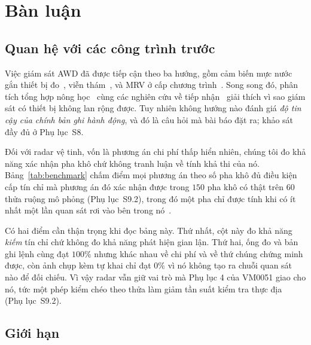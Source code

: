 \section{Bàn luận}
\label{sec:discussion}

\subsection{Quan hệ với các công trình trước}

Việc giám sát AWD đã được tiếp cận theo ba hướng, gồm cảm biến mực nước gắn thiết bị
đo~\cite{delacruz2022}, viễn thám~\cite{lovell2019,islam2026alose,mlrice2025,narayanan2024},
và MRV ở cấp chương trình~\cite{qd1490,mae2026progress,irri2026mrv}. Song song
đó, phân tích tổng hợp nông học~\cite{carrijo2017} cùng các nghiên cứu về tiếp
nhận~\cite{lampayan2015,enriquez2021} giải thích vì sao giám sát có thiết bị
không lan rộng được. Tuy nhiên không hướng nào đánh giá \emph{độ tin cậy của
chính bản ghi hành động}, và đó là câu hỏi mà bài báo đặt ra; khảo sát đầy đủ ở
Phụ lục~S8.

Đối với radar vệ tinh, vốn là phương án chi phí thấp hiển nhiên, chúng tôi đo khả
năng xác nhận pha khô chứ không tranh luận về tính khả thi của nó. Bảng~\ref{tab:benchmark} chấm điểm mọi phương án theo số pha khô đủ điều kiện cấp tín
chỉ mà phương án đó xác nhận được trong $150$ pha khô có thật trên $60$ thửa ruộng mô
phỏng (Phụ lục~S9.2), trong đó một pha chỉ được tính khi có ít nhất một lần quan sát
rơi vào bên trong nó~\cite{clauss2017s1,hashemi2022s1,delacruz2022}.

Có hai điểm cần thận trọng khi đọc bảng này. Thứ nhất, cột này đo khả năng
\emph{kiếm} tín chỉ chứ không đo khả năng phát hiện gian lận. Thứ hai, ống đo và
bản ghi lệnh cùng đạt $100\%$ nhưng khác nhau về chi phí và về thứ chúng chứng
minh được, còn ảnh chụp kèm tự khai chỉ đạt $0\%$ vì nó không tạo ra chuỗi quan
sát nào để đối chiếu. Vì vậy radar vẫn giữ vai trò mà Phụ lục 4 của VM0051 giao
cho nó, tức một phép kiểm chéo theo thửa làm giảm tần suất kiểm tra thực
địa~\cite{vm0051} (Phụ lục~S9.2).

\subsection{Giới hạn}

